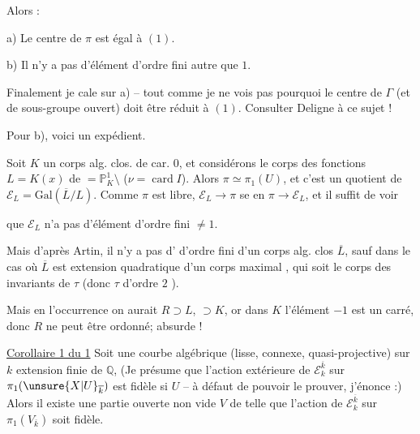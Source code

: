 Alors :

a) Le centre de $\pi$ est  égal à $(1)$.

b) Il n'y a pas  d'élément d'ordre fini autre que $1$.

Finalement je cale sur a) -- tout comme je ne vois pas pourquoi le centre de $\Gamma$
(et de  sous-groupe ouvert) doit être réduit à $(1)$. Consulter Deligne à ce sujet !

Pour b), voici un expédient.

Soit $K$ un corps alg. clos. de car. $0$, et considérons le corps des fonctions
$L=K(x)$ de 
$=\mathbb P^1_K\setminus$
($\nu=\operatorname{card} I$). Alors $\pi\simeq\pi_1(U)$, et c'est un quotient de
$\mathcal E_L=\mathrm{Gal}(\overline L/L)$.
Comme $\pi$ est libre, $\mathcal E_L\longrightarrow\pi$ se  en
$\pi\longrightarrow\mathcal E_L$, et il suffit de voir



que $\mathcal E_L$ n'a pas d'élément d'ordre fini $\ne 1$.

Mais d'après Artin, il n'y a pas d' \inserted{\unsure{$\tau$}}
d'ordre fini  d'un corps alg. clos $\overline L$,
sauf dans le cas où $\overline L$ est extension quadratique d'un
 corps  maximal
,  qui soit le corps des invariants de
$\tau$ (donc $\tau$ d'ordre $2$ ).

 Mais en l'occurrence on aurait $R\supset L$,
$\supset K$, or dans $K$ l'élément $-1$ est un carré,
donc $R$ ne peut être ordonné; absurde !

\uline{Corollaire 1 du  1} Soit  une courbe algébrique
(lisse,  connexe, quasi-projective) sur $k$ extension finie de
$\mathbb Q$,  (Je présume que l'action extérieure de
$\mathcal E_k^{\overline k}$ sur $\pi_1(\unsure{X|U}_{\overline k})$ est fidèle
si $U$  -- à défaut de pouvoir le prouver, j'énonce :)
Alors il existe une partie ouverte non vide $V$ de  telle que
l'action  de $\mathcal E_k^{\overline k}$ sur
$\pi_1(V_{\overline k})$ soit fidèle.

